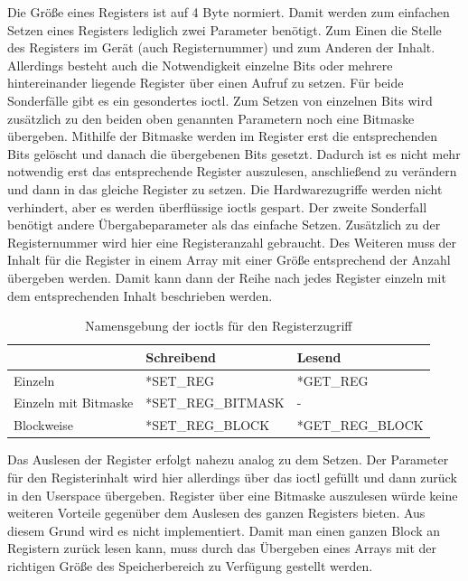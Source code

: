 Die Größe eines Registers ist auf 4 Byte normiert. Damit werden zum einfachen Setzen eines Registers lediglich zwei Parameter benötigt. Zum Einen die Stelle des Registers im Gerät (auch Registernummer) und zum Anderen der Inhalt. 
Allerdings besteht auch die Notwendigkeit einzelne Bits oder mehrere hintereinander liegende Register über einen Aufruf zu setzen. Für beide Sonderfälle gibt es ein gesondertes \ac{ioctl}. Zum Setzen von einzelnen Bits wird zusätzlich zu den beiden oben genannten Parametern noch eine Bitmaske übergeben. Mithilfe der Bitmaske werden im Register erst die entsprechenden Bits gelöscht und danach die übergebenen Bits gesetzt. Dadurch ist es nicht mehr notwendig erst das entsprechende Register auszulesen, anschließend zu verändern und dann in das gleiche Register zu setzen. Die Hardwarezugriffe werden nicht verhindert, aber es werden überflüssige \ac{ioctl}s gespart.
Der zweite Sonderfall benötigt andere Übergabeparameter als das einfache Setzen. Zusätzlich zu der Registernummer wird hier eine Registeranzahl gebraucht. Des Weiteren muss der Inhalt für die Register in einem Array mit einer Größe entsprechend der Anzahl übergeben werden. Damit kann dann der Reihe nach jedes Register einzeln mit dem entsprechenden Inhalt beschrieben werden.\\


\begin{table}
\centering	
\begin{tabular}[h]{l|l|l}
	& Schreibend & Lesend \\
	\hline
	Einzeln & *SET\_REG & *GET\_REG\\
	\hline
	Einzeln mit Bitmaske & *SET\_REG\_BITMASK & - \\
	\hline
	Blockweise & *SET\_REG\_BLOCK & *GET\_REG\_BLOCK\\
\end{tabular}
\caption{Namensgebung der \ac{ioctl}s für den Registerzugriff} \label{tab:ioctl}
\end{table}


Das Auslesen der Register erfolgt nahezu analog zu dem Setzen. Der Parameter für den Registerinhalt wird hier allerdings über das \ac{ioctl} gefüllt und dann zurück in den Userspace übergeben. 
Register über eine Bitmaske auszulesen würde keine weiteren Vorteile gegenüber dem Auslesen des ganzen Registers bieten. Aus diesem Grund wird es nicht implementiert.  
Damit man einen ganzen Block an Registern zurück lesen kann, muss durch das Übergeben eines Arrays mit der richtigen Größe des Speicherbereich zu Verfügung gestellt werden.\\

